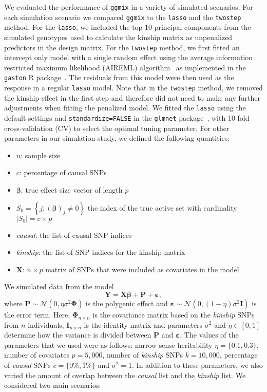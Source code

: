\documentclass[10pt,letterpaper]{article}
\newcommand{\bX}{\textbf{X}}
\newcommand{\bY}{\textbf{Y}}
\newcommand{\bI}{\textbf{I}}
\newcommand{\be}{\boldsymbol{\varepsilon}}
\newcommand{\bbeta}{\boldsymbol{\beta}}
\newcommand{\bPhi}{\boldsymbol{\Phi}}
\begin{document}
We evaluated the performance of \texttt{ggmix} in a variety of simulated scenarios. For each simulation scenario we compared \texttt{ggmix} to the \texttt{lasso} and the \texttt{twostep} method. For the \texttt{lasso}, we included the top 10 principal components from the simulated genotypes used to calculate the kinship matrix as unpenalized predictors in the design matrix. For the \texttt{twostep} method, we first fitted an intercept only model with a single random effect using the average information restricted maximum likelihood (AIREML) algorithm~\cite{gilmour1995average} as implemented in the \texttt{gaston} R package~\cite{gaston}. The residuals from this model were then used as the response in a regular \texttt{lasso} model. Note that in the \texttt{twostep} method, we removed the kinship effect in the first step and therefore did not need to make any further adjustments when fitting the penalized model. We fitted the \texttt{lasso} using the default settings and \texttt{standardize=FALSE} in the \texttt{glmnet} package~\cite{friedman2010regularization}, with 10-fold cross-validation (CV) to select the optimal tuning parameter. For other parameters in our simulation study, we defined the following quantities:

\begin{itemize}
	\item $n$: sample size
	\item $c$: percentage of causal SNPs
	\item $\bbeta$: true effect size vector of length $p$ 
	\item $S_0 = \left\lbrace j; (\bbeta)_j \neq 0 \right\rbrace$ the index of the true active set with cardinality $ |S_0| = c\times p$
	\item \textit{causal}: the list of causal SNP indices
	\item \textit{kinship}: the list of SNP indices for the kinship matrix
	\item $\bX$: $n \times p$ matrix of SNPs that were included as covariates in the model
\end{itemize}

We simulated data from the model
\begin{equation*}
\bY = \bX \bbeta + \mathbf{P} + \be,
\end{equation*}
where $\mathbf{P}\sim \mathcal{N}(0, \eta \sigma^2 \bPhi)$ is the polygenic effect and $\be \sim \mathcal{N}(0, (1-\eta) \sigma^2 \bI)$ is the error term. Here, $\bPhi_{n \times n}$ is the covariance matrix based on the \textit{kinship} SNPs from $n$ individuals, $\bI_{n \times n}$ is the identity matrix and parameters $\sigma^2$ and $\eta \in [0,1]$ determine how the variance is divided between $\mathbf{P}$ and $\be$. The values of the parameters that we used were as follows: narrow sense heritability $\eta=\lbrace 0.1, 0.3 \rbrace$, number of covariates $p = 5,000$, number of \textit{kinship} SNPs $k = 10,000$, percentage of \textit{causal} SNPs $c=\lbrace 0\%, 1\%\rbrace$ and $\sigma^2 = 1$. In addition to these parameters, we also varied the amount of overlap between the \textit{causal} list and the \textit{kinship} list. We considered two main scenarios:
\end{document}
